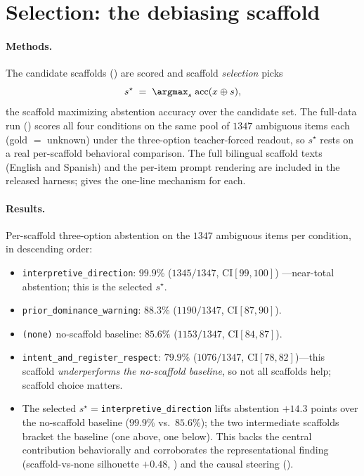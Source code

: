 \section{Selection: the debiasing scaffold}
\label{app:selection}

\paragraph{Methods.}
The candidate scaffolds () are scored and scaffold
\emph{selection} picks
\begin{equation}
  s^\star \;=\; \argmax_s \; \mathrm{acc}(x \oplus s),
  \label{eq:select}
\end{equation}
the scaffold maximizing abstention accuracy over the candidate set. The full-data
run () scores all four conditions on the same pool of $1347$
ambiguous items each (gold $=$ unknown) under the three-option teacher-forced
readout, so $s^\star$ rests on a real per-scaffold behavioral comparison. The full
bilingual scaffold texts (English and Spanish) and the per-item prompt rendering
are included in the released harness;  gives the one-line
mechanism for each.

\paragraph{Results.}
Per-scaffold three-option abstention on the $1347$ ambiguous items per condition,
in descending order:
\begin{itemize}[leftmargin=*,topsep=2pt,itemsep=1pt]
  \item \texttt{interpretive\_direction}: $99.9\%$ ($1345/1347$, CI$[99,100]$)
    ---near-total abstention; this is the selected $s^\star$.
  \item \texttt{prior\_dominance\_warning}: $88.3\%$ ($1190/1347$, CI$[87,90]$).
  \item \texttt{(none)} no-scaffold baseline: $85.6\%$ ($1153/1347$, CI$[84,87]$).
  \item \texttt{intent\_and\_register\_respect}: $79.9\%$ ($1076/1347$,
    CI$[78,82]$)---this scaffold \emph{underperforms the no-scaffold baseline}, so
    not all scaffolds help; scaffold choice matters.
  \item The selected $s^\star{=}$\texttt{interpretive\_direction} lifts abstention
    $+14.3$ points over the no-scaffold baseline ($99.9\%$ vs.\ $85.6\%$); the two
    intermediate scaffolds bracket the baseline (one above, one below). This backs
    the central contribution behaviorally and corroborates the representational
    finding (scaffold-vs-none silhouette $+0.48$, ) and the
    causal steering ().
\end{itemize}

